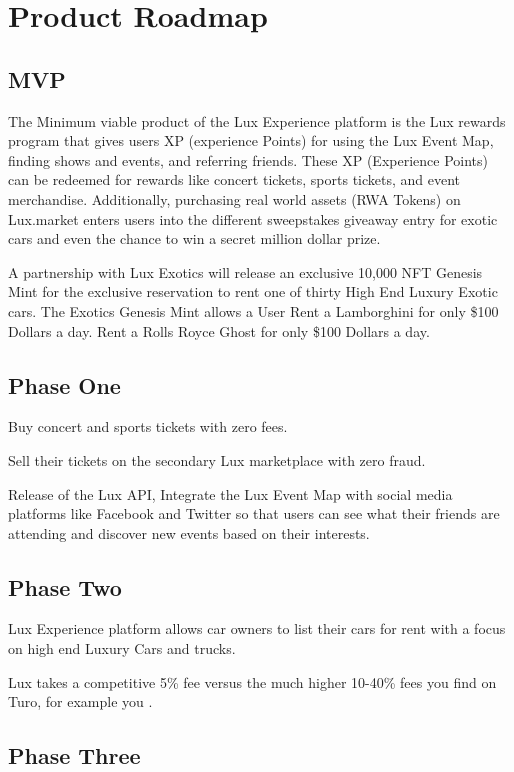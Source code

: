 \documentclass[11pt]{article}
\begin{document}
\section{Product Roadmap}

\subsection{MVP}

The Minimum viable product of the Lux Experience platform is the Lux rewards program that gives users XP (experience Points) for using the Lux Event Map, finding shows and events, and referring friends. These XP (Experience Points) can be redeemed for rewards like concert tickets, sports tickets, and event merchandise.  Additionally, purchasing real world assets (RWA Tokens) on Lux.market enters users into the different sweepstakes giveaway entry for exotic cars and even the chance to win a secret million dollar prize.


A partnership with Lux Exotics will release an exclusive 10,000 NFT Genesis Mint for the exclusive reservation to rent one of thirty High End Luxury Exotic cars. The Exotics Genesis Mint allows a User Rent a Lamborghini for only \$100 Dollars a day. Rent a Rolls Royce Ghost for only \$100 Dollars a day.


\subsection{Phase One}

Buy concert and sports tickets with zero fees.


Sell their tickets on the secondary Lux marketplace with zero fraud.


Release of the Lux API, Integrate the Lux Event Map with social media platforms like Facebook and Twitter so that users can see what their friends are attending and discover new events based on their interests.


\subsection{Phase Two}

Lux Experience platform allows car owners to list their cars for rent with a focus on high end Luxury Cars and trucks.


Lux takes a competitive 5\% fee versus the much higher 10-40\% fees you find on Turo, for example you .


\subsection{Phase Three}
\end{document}
